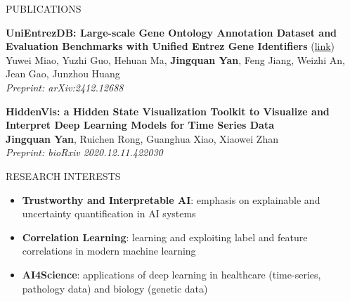 \documentclass{resume} %
\begin{document}
\begin{rSection}{PUBLICATIONS}
\begin{enumerate}[label={[\arabic*]}]
  
  
      \item \textbf{UniEntrezDB: Large-scale Gene Ontology Annotation Dataset and Evaluation Benchmarks with Unified Entrez Gene Identifiers} (\href{https://arxiv.org/abs/2412.12688}{link}) \hfill \\
  Yuwei Miao, Yuzhi Guo, Hehuan Ma, \textbf{Jingquan Yan}, Feng Jiang, Weizhi An, Jean Gao, Junzhou Huang \hfill \\
  \textit{Preprint: arXiv:2412.12688}
  
  \item \textbf{HiddenVis: a Hidden State Visualization Toolkit to Visualize and Interpret Deep Learning Models for Time Series Data} \hfill \\
  \textbf{Jingquan Yan}, Ruichen Rong, Guanghua Xiao, Xiaowei Zhan \hfill \\
  \textit{Preprint: bioRxiv 2020.12.11.422030}
\end{enumerate}
\end{rSection}

\begin{rSection}{RESEARCH INTERESTS}
\begin{itemize}
    \item \textbf{Trustworthy and Interpretable AI}: emphasis on explainable and uncertainty quantification in AI systems
    \item \textbf{Correlation Learning}: learning and exploiting label and feature correlations in modern machine learning
    \item \textbf{AI4Science}: applications of deep learning in healthcare (time-series, pathology data) and biology (genetic data)
\end{itemize}

\end{rSection}
\end{document}

